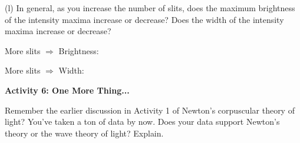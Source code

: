 (l) In general, as you increase the number of slits, does the maximum brightness of the intensity maxima increase or decrease? Does the width of the intensity maxima increase or decrease?


\medskip
\hspace{0.5in} More slits $\Longrightarrow$ Brightness:
\medskip

\hspace{0.5in} More slits $\Longrightarrow$ Width:
\medskip


\textbf{Activity 6: One More Thing...}

Remember the earlier discussion in Activity 1 of Newton's corpuscular theory of
light? You've taken a ton of data by now.  Does your data support Newton's theory or the wave theory of light?
Explain.
\answerspace{\fill}
